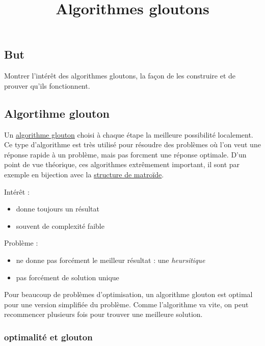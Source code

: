 \documentclass[
]{article}
\title{Algorithmes gloutons}
\author{}
\date{}
\providecommand{\tightlist}{%
  \setlength{\itemsep}{0pt}\setlength{\parskip}{0pt}}
\begin{document}
\maketitle

\hypertarget{but}{%
\subsection{But}\label{but}}

Montrer l'intérêt des algorithmes gloutons, la façon de les construire
et de prouver qu'ils fonctionnent.

\hypertarget{algortihme-glouton}{%
\subsection{Algortihme glouton}\label{algortihme-glouton}}

Un \href{https://fr.wikipedia.org/wiki/Algorithme_glouton}{algorithme
glouton} choisi à chaque étape la meilleure possibilité localement. Ce
type d'algorithme est très utilisé pour résoudre des problèmes où l'on
veut une réponse rapide à un problème, mais pas forcment une réponse
optimale. D'un point de vue théorique, ces algorithmes extrêmement
important, il sont par exemple en bijection avec la
\href{https://fr.wikipedia.org/wiki/Matro\%C3\%AFde}{structure de
matroïde}.

Intérêt :

\begin{itemize}
\tightlist
\item
  donne toujours un résultat
\item
  souvent de complexité faible
\end{itemize}

Problème :

\begin{itemize}
\tightlist
\item
  ne donne pas forcément le meilleur résultat : une \emph{heursitique}
\item
  pas forcément de solution unique
\end{itemize}

Pour beaucoup de problèmes d'optimisation, un algorithme glouton est
optimal pour une version simplifiée du problème. Comme l'algorithme va
vite, on peut recommencer plusieurs fois pour trouver une meilleure
solution.


\hypertarget{optimalituxe9-et-glouton}{%
\subsubsection{optimalité et glouton}\label{optimalituxe9-et-glouton}}
\end{document}
